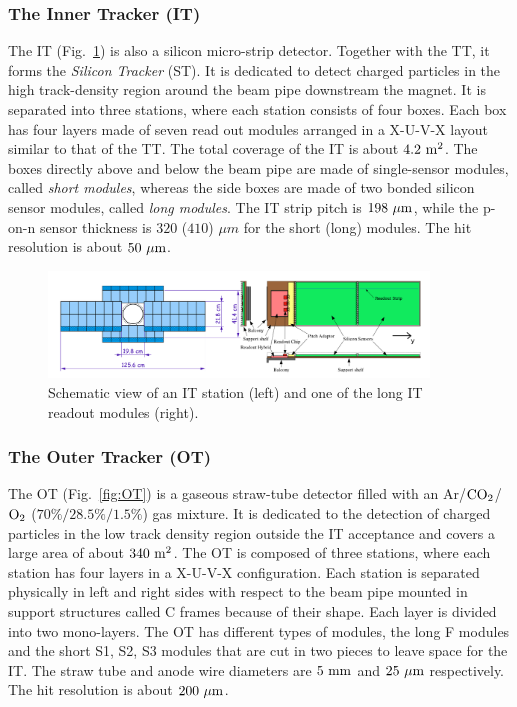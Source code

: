 \subsubsection*{The Inner Tracker (IT)}

The IT \cite{LHCb-TDR-008} (Fig.~\ref{fig:IT}) is also a silicon micro-strip detector. Together with the TT, it forms the \emph{Silicon Tracker} (ST). It is dedicated to detect charged particles in the high track-density region around the beam pipe downstream the magnet. It is separated into three stations, where each station consists of four boxes. Each box has four layers made of seven read out modules arranged in a X-U-V-X layout similar to that of the TT.
The total coverage of the IT is about $4.2~\rm m^2$. The boxes directly above and below the beam pipe are made of single-sensor modules, called \emph{short modules}, whereas the side boxes are made of two bonded silicon sensor modules, called \emph{long modules}. The IT strip pitch is $198~\rm\mu m$, while the p-on-n sensor thickness is $320$ ($410$) $\mu m$ for the short (long) modules. The hit resolution is about $50~\rm\mu m$.

\begin{figure}[t]
  \begin{center}
    \includegraphics[width=0.9\textwidth]{02LHCb/figs/IT.png}
  \end{center}
  \vspace{-2mm}
  \caption{Schematic view of an IT station (left) and one of the long IT readout modules (right).}
  \label{fig:IT}
\end{figure}

\subsubsection*{The Outer Tracker (OT)}

The OT \cite{LHCb-TDR-006} (Fig.~\ref{fig:OT}) is a gaseous straw-tube detector filled with an Ar/$\rm CO_2$/$\rm O_2$ ($70\%/28.5\%/1.5\%$) gas mixture. It is dedicated to the detection of charged particles in the low track density region outside the IT acceptance and covers a large area of about $340~\rm m^2$. The OT is composed of three stations, where each station has four layers in a X-U-V-X configuration. Each station is separated physically in left and right sides with respect to the beam pipe mounted in support structures called C frames because of their shape. Each layer is divided into two mono-layers. The OT has different types of modules, the long F modules and the short S1, S2, S3 modules that are cut in two pieces to leave space for the IT. The straw tube and anode wire diameters are $5~\rm mm$ and $25~\rm\mu m$ respectively. The hit resolution is about $200~\mu\rm m$.

